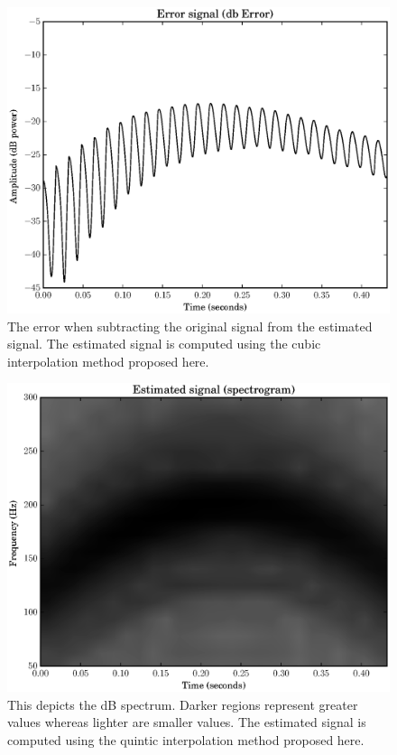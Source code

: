\documentclass[letterpaper,12pt]{report}
\begin{document}
\begin{figure}
    \includegraphics[width=\textwidth]{plots/mq_mod_cubic_error.eps}
    \caption{The error when subtracting the original signal from the estimated
        signal. The estimated signal is computed using the cubic interpolation
        method proposed here.
    \label{plot:mqmodcubicerror}}
\end{figure}


\begin{figure}
    \includegraphics[width=\textwidth]{plots/mq_mod_quintic_estimated_spec.eps}
    \caption{This depicts the dB spectrum. Darker regions represent greater
        values whereas lighter are smaller values. The estimated signal is
        computed using the quintic interpolation method proposed here.
    \label{plot:mqmodcubicestimatedspec}}
\end{figure}
\end{document}
